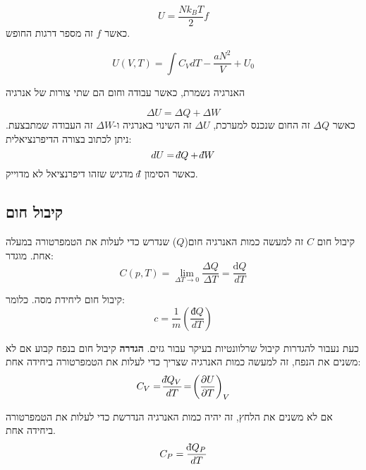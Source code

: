 \documentclass{tstextbook}
\begin{document}
\begin{proposition}
$$U={\frac{N k_{B}T}{2}}f$$
כאשר \(f\) זה מספר דרגות החופש.

\end{proposition}
\begin{proposition}
$$U(V,T)=\int C_{V}d T-{\frac{a N^{2}}{V}}+U_{0}$$

\end{proposition}
\begin{theorem}
האנרגיה נשמרת, כאשר עבודה וחום הם שתי צורות של אנרגיה

\end{theorem}
\begin{corollary}
$$\Delta U=\Delta Q+\Delta W$$
כאשר \(\Delta Q\) זה החום שנכנס למערכת, \(\Delta U\) זה השינוי באנרגיה ו-\(\Delta W\) זה העבודה שמתבצעת. ניתן לכתוב בצורה הדיפרנציאלית:
$$dU=\;\bar{}\mkern-7.5mu dQ+\;\bar{}\mkern-7.5mu dW$$
כאשר הסימון \(\;\bar{}\mkern-7.5mu d\) מדגיש שזהו דיפרנציאל לא מדוייק.

\end{corollary}
\subsection{קיבול חום}

\begin{definition}
קיבול חום \(C\) זה למעשה כמות האנרגיה חום(\(Q\)) שנדרש כדי לעלות את הטמפרטורה במעלה אחת. מוגדר:
$$C(p,T)=\operatorname*{lim}_{\Delta T\rightarrow0}\frac{\Delta Q}{\Delta T}=\frac{\mathrm{d}Q}{d T}$$

\end{definition}
\begin{definition}
קיבול חום ליחידת מסה. כלומר:
$$c=\frac{1}{m}\left( \frac{ đ Q}{d T} \right)$$

\end{definition}
כעת נעבור להגדרות קיבול שרלוונטיות בעיקר עבור גזים.
\textbf{הגדרה} קיבול חום בנפח קבוע
אם לא משנים את הנפח, זה למעשה כמות האנרגיה שצריך כדי לעלות את הטמפרטורה ביחידה אחת:
$$C_{V}=\!\frac{\;\bar{}\mkern-7.5mu dQ_{V}}{d T}\!=\!\left(\frac{\partial U}{\partial T}\right)_{V}$$

\begin{definition}
אם לא משנים את הלחץ, זה יהיה כמות האנרגיה הנדרשת כדי לעלות את הטמפרטורה ביחידה אחת.
$$C_{P}={\frac{\mathrm{\;\bar{}\mkern-7.5mu d}Q_{P}}{d T}}$$

\end{definition}
\end{document}
